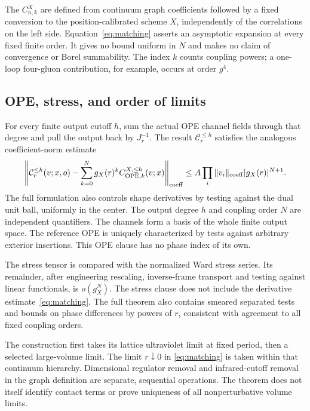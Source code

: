 \documentclass[11pt]{article}
\begin{document}
The $C^X_{n,k}$ are defined from continuum graph coefficients followed by a
fixed conversion to the position-calibrated scheme $X$, independently of
the correlations on the left side. Equation~\eqref{eq:matching} asserts an
asymptotic expansion at every fixed finite order. It gives no bound uniform
in $N$ and makes no claim of convergence or Borel summability. The index $k$
counts coupling powers; a one-loop four-gluon contribution, for example,
occurs at order $g^4$.

\subsection{OPE, stress, and order of limits}

For every finite output cutoff $h$, sum the actual OPE channel fields through
that degree and pull the output back by $J_r^{-1}$. The result
$\mathcal C_r^{\le h}$ satisfies the analogous coefficient-norm estimate
\begin{equation}\label{eq:ope}
 \left\|\mathcal C_r^{\le h}(v;x,o)
 -\sum_{k=0}^N g_X(r)^k C_{\mathrm{OPE},k}^{X,\le h}(v;x)\right\|_{\rm coeff}
 \le A\prod_i\|v_i\|_{\rm coeff}|g_X(r)|^{N+1}.
\end{equation}
The full formulation also controls shape derivatives by testing against the
dual unit ball, uniformly in the center. The output degree $h$ and coupling
order $N$ are independent quantifiers. The channels form a basis of the
whole finite output space. The reference OPE is uniquely characterized by
tests against arbitrary exterior insertions. This OPE clause has no phase
index of its own.

The stress tensor is compared with the normalized Ward stress series. Its
remainder, after engineering rescaling, inverse-frame transport and testing
against linear functionals, is $o(g_X^N)$. The stress clause does not include
the derivative estimate~\eqref{eq:matching}. The full theorem also contains
smeared separated tests and bounds on phase differences by powers of $r$,
consistent with agreement to all fixed coupling orders.

The construction first takes its lattice ultraviolet limit at fixed period,
then a selected large-volume limit. The limit $r\downarrow0$ in
\eqref{eq:matching} is taken within that continuum hierarchy. Dimensional
regulator removal and infrared-cutoff removal in the graph definition are
separate, sequential operations. The theorem does not itself identify
contact terms or prove uniqueness of all nonperturbative volume limits.
\end{document}
